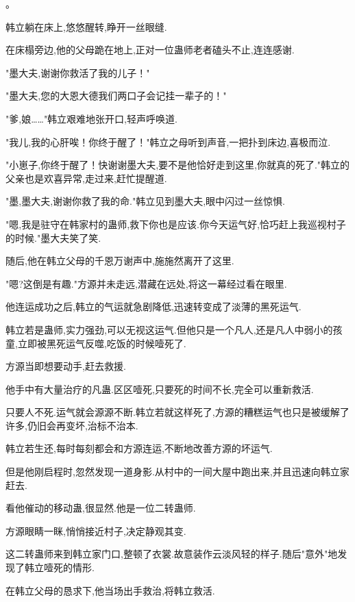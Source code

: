 
\begin{this_body}

。

韩立躺在床上,悠悠醒转,睁开一丝眼缝.

在床榻旁边,他的父母跪在地上,正对一位蛊师老者磕头不止,连连感谢.

"墨大夫,谢谢你救活了我的儿子！"

"墨大夫,您的大恩大德我们两口子会记挂一辈子的！"

"爹,娘……"韩立艰难地张开口,轻声呼唤道.

"我儿,我的心肝唉！你终于醒了！"韩立之母听到声音,一把扑到床边,喜极而泣.

"小崽子,你终于醒了！快谢谢墨大夫,要不是他恰好走到这里,你就真的死了."韩立的父亲也是欢喜异常,走过来,赶忙提醒道.

"墨,墨大夫,谢谢你救了我的命."韩立见到墨大夫,眼中闪过一丝惊惧.

"嗯,我是驻守在韩家村的蛊师,救下你也是应该.你今天运气好,恰巧赶上我巡视村子的时候."墨大夫笑了笑.

随后,他在韩立父母的千恩万谢声中,施施然离开了这里.

"嗯?这倒是有趣."方源并未走远,潜藏在远处,将这一幕经过看在眼里.

他连运成功之后,韩立的气运就急剧降低,迅速转变成了淡薄的黑死运气.

韩立若是蛊师,实力强劲,可以无视这运气.但他只是一个凡人,还是凡人中弱小的孩童,立即被黑死运气反噬,吃饭的时候噎死了.

方源当即想要动手,赶去救援.

他手中有大量治疗的凡蛊.区区噎死,只要死的时间不长,完全可以重新救活.

只要人不死.运气就会源源不断.韩立若就这样死了,方源的糟糕运气也只是被缓解了许多,仍旧会再变坏,治标不治本.

韩立若生还,每时每刻都会和方源连运,不断地改善方源的坏运气.

但是他刚启程时,忽然发现一道身影.从村中的一间大屋中跑出来,并且迅速向韩立家赶去.

看他催动的移动蛊,很显然.他是一位二转蛊师.

方源眼睛一眯,悄悄接近村子,决定静观其变.

这二转蛊师来到韩立家门口,整顿了衣裳.故意装作云淡风轻的样子.随后"意外"地发现了韩立噎死的情形.

在韩立父母的恳求下,他当场出手救治,将韩立救活.


\end{this_body}
